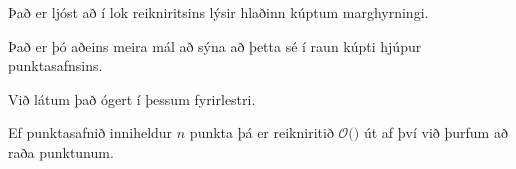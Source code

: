 {
	{
		\item<1-> Það er ljóst að í lok reikniritsins lýsir hlaðinn kúptum marghyrningi.
		\item<2-> Það er þó aðeins meira mál að sýna að þetta sé í raun kúpti hjúpur punktasafnsins.
		\item<3-> Við látum það ógert í þessum fyrirlestri.
		\item<4-> Ef punktasafnið inniheldur $n$ punkta þá er reikniritið $\mathcal{O}($$)$ út af því við þurfum að 
			raða punktunum.
	}
}

{
}

{
}


